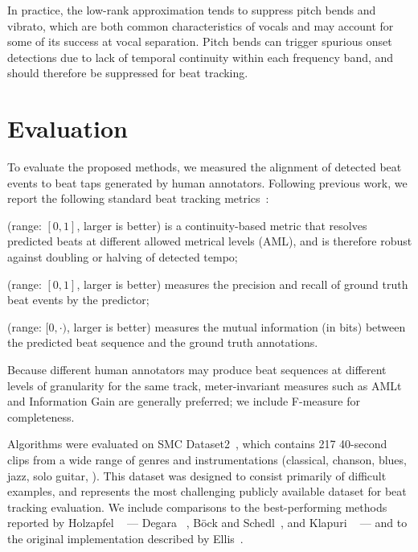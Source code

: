 \documentclass{article}
\begin{document}
In practice, the low-rank approximation tends to suppress pitch bends and vibrato,
which are both common characteristics of vocals and may account for some of its success
at vocal separation.  Pitch bends can trigger spurious onset 
detections due to lack of temporal continuity within each frequency band, and should
therefore be suppressed for beat tracking.  

\section{Evaluation}
\label{sec:eval}

To evaluate the proposed methods, we measured the alignment of detected beat events to 
beat taps generated by human annotators.  Following previous work, we report the
following standard beat tracking metrics~\cite{davies2009evaluation}:
\begin{description}\addtolength{\itemsep}{-.75\baselineskip}
\item[AMLt] (range: $[0, 1]$, larger is better) is a continuity-based metric that
resolves predicted beats at different allowed metrical levels (AML), and is therefore 
robust against doubling or halving of detected tempo;
\item[F-measure] (range: $[0,1]$, larger is better) measures the precision and recall of ground truth beat events by the predictor; 
\item[Information gain] (range: $[0, \cdot)$, larger is better) measures the mutual information (in bits) between the predicted beat sequence and the ground truth annotations.
\end{description}
Because different human annotators may produce beat sequences at
different levels of granularity for the same track, meter-invariant measures such as
AMLt and Information Gain are generally preferred; we include F-measure for
completeness.

Algorithms were evaluated on SMC Dataset2~\cite{holzapfel2012}, which contains 217
40-second clips from a wide range of genres and instrumentations (classical, chanson, 
blues, jazz, solo guitar, \etc).  This dataset was designed to consist primarily of 
difficult examples, and represents the most challenging publicly available dataset for beat
tracking evaluation.  We include comparisons to the best-performing methods reported by
Holzapfel \etal~\cite{holzapfel2012} --- Degara \etal~\cite{degara2012reliability}, B\"{o}ck and Schedl~\cite{bock2011enhanced}, and
Klapuri \etal~\cite{klapuri2006analysis} --- and to the original implementation described by
Ellis~\cite{ellis2007beat}.
\end{document}
